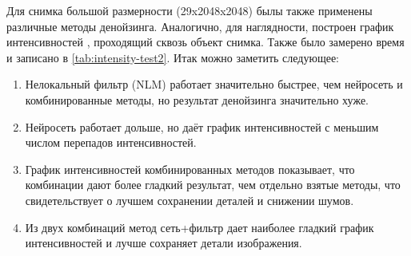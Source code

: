 \par Для снимка большой размерности (29x2048x2048) былы также применены различные методы денойзинга. Аналогично, для наглядности, построен график интенсивностей , проходящий сквозь объект снимка. Также было замерено время и записано в \ref{tab:intensity-test2}. Итак можно заметить следующее: 
\begin{enumerate}[]
	\item  Нелокальный фильтр (NLM) работает значительно быстрее, чем нейросеть и комбинированные методы, но результат денойзинга значительно хуже.
	\item Нейросеть работает дольше, но даёт график интенсивностей с меньшим числом перепадов интенсивностей.
	\item График интенсивностей комбинированных методов показывает, что комбинации дают более гладкий результат, чем отдельно взятые методы, что свидетельствует о лучшем сохранении деталей и снижении шумов.
	\item Из двух комбинаций метод сеть+фильтр дает наиболее гладкий график интенсивностей и лучше сохраняет детали изображения.
\end{enumerate}

